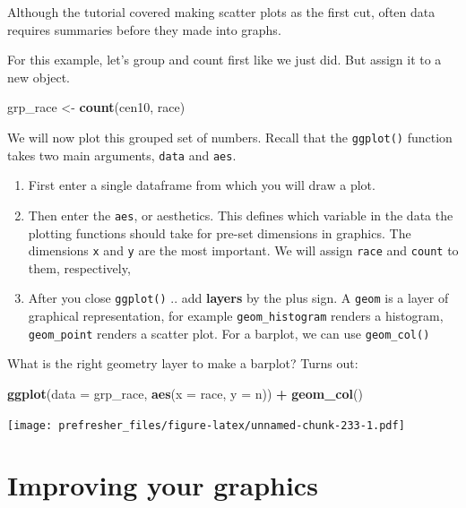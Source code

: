 \documentclass[]{book}
\newenvironment{Shaded}{\begin{snugshade}}{\end{snugshade}}
\newcommand{\KeywordTok}[1]{\textcolor[rgb]{0.13,0.29,0.53}{\textbf{#1}}}
\newcommand{\DataTypeTok}[1]{\textcolor[rgb]{0.13,0.29,0.53}{#1}}
\newcommand{\StringTok}[1]{\textcolor[rgb]{0.31,0.60,0.02}{#1}}
\newcommand{\OperatorTok}[1]{\textcolor[rgb]{0.81,0.36,0.00}{\textbf{#1}}}
\newcommand{\NormalTok}[1]{#1}
\providecommand{\tightlist}{%
  \setlength{\itemsep}{0pt}\setlength{\parskip}{0pt}}
\theoremstyle{definition}
\theoremstyle{definition}
\theoremstyle{definition}
\theoremstyle{remark}
\begin{document}
Although the tutorial covered making scatter plots as the first cut,
often data requires summaries before they made into graphs.

For this example, let's group and count first like we just did. But
assign it to a new object.

\begin{Shaded}
\begin{Highlighting}[]
\NormalTok{grp_race <-}\StringTok{ }\KeywordTok{count}\NormalTok{(cen10, race)}
\end{Highlighting}
\end{Shaded}

We will now plot this grouped set of numbers. Recall that the
\texttt{ggplot()} function takes two main arguments, \texttt{data} and
\texttt{aes}.

\begin{enumerate}
\def\labelenumi{\arabic{enumi}.}
\tightlist
\item
  First enter a single dataframe from which you will draw a plot.
\item
  Then enter the \texttt{aes}, or aesthetics. This defines which
  variable in the data the plotting functions should take for pre-set
  dimensions in graphics. The dimensions \texttt{x} and \texttt{y} are
  the most important. We will assign \texttt{race} and \texttt{count} to
  them, respectively,
\item
  After you close \texttt{ggplot()} .. add \textbf{layers} by the plus
  sign. A \texttt{geom} is a layer of graphical representation, for
  example \texttt{geom\_histogram} renders a histogram,
  \texttt{geom\_point} renders a scatter plot. For a barplot, we can use
  \texttt{geom\_col()}
\end{enumerate}

What is the right geometry layer to make a barplot? Turns out:

\begin{Shaded}
\begin{Highlighting}[]
\KeywordTok{ggplot}\NormalTok{(}\DataTypeTok{data =}\NormalTok{ grp_race, }\KeywordTok{aes}\NormalTok{(}\DataTypeTok{x =}\NormalTok{ race, }\DataTypeTok{y =}\NormalTok{ n)) }\OperatorTok{+}\StringTok{ }\KeywordTok{geom_col}\NormalTok{()}
\end{Highlighting}
\end{Shaded}

\texttt{[image: prefresher\_files/figure-latex/unnamed-chunk-233-1.pdf]}

\section{Improving your graphics}\label{improving-your-graphics}
\end{document}
